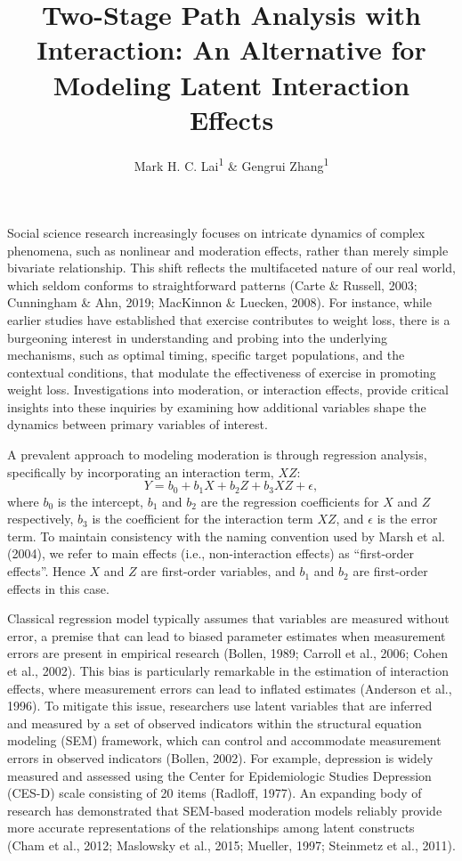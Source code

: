 \documentclass[
  man]{apa6}
\title{Two-Stage Path Analysis with Interaction: An Alternative for Modeling Latent Interaction Effects}
\author{Mark H. C. Lai\textsuperscript{1} \& Gengrui Zhang\textsuperscript{1}}
\date{}
\affiliation{\vspace{0.5cm}\textsuperscript{1} \protect{Department of Psychology, University of Southern California}}
\begin{document}
\maketitle

Social science research increasingly focuses on intricate dynamics of complex phenomena, such as nonlinear and moderation effects, rather than merely simple bivariate relationship. This shift reflects the multifaceted nature of our real world, which seldom conforms to straightforward patterns (Carte \& Russell, 2003; Cunningham \& Ahn, 2019; MacKinnon \& Luecken, 2008). For instance, while earlier studies have established that exercise contributes to weight loss, there is a burgeoning interest in understanding and probing into the underlying mechanisms, such as optimal timing, specific target populations, and the contextual conditions, that modulate the effectiveness of exercise in promoting weight loss. Investigations into moderation, or interaction effects, provide critical insights into these inquiries by examining how additional variables shape the dynamics between primary variables of interest.

A prevalent approach to modeling moderation is through regression analysis, specifically by incorporating an interaction term, \(XZ\):
\begin{equation}
Y = b_{0} + b_{1}X + b_{2}Z + b_{3}XZ + \epsilon,
\end{equation}
where \(b_{0}\) is the intercept, \(b_{1}\) and \(b_{2}\) are the regression coefficients for \(X\) and \(Z\) respectively, \(b_{3}\) is the coefficient for the interaction term \(XZ\), and \(\epsilon\) is the error term. To maintain consistency with the naming convention used by Marsh et al. (2004), we refer to main effects (i.e., non-interaction effects) as ``first-order effects''. Hence \(X\) and \(Z\) are first-order variables, and \(b_{1}\) and \(b_{2}\) are first-order effects in this case.

Classical regression model typically assumes that variables are measured without error, a premise that can lead to biased parameter estimates when measurement errors are present in empirical research (Bollen, 1989; Carroll et al., 2006; Cohen et al., 2002). This bias is particularly remarkable in the estimation of interaction effects, where measurement errors can lead to inflated estimates (Anderson et al., 1996). To mitigate this issue, researchers use latent variables that are inferred and measured by a set of observed indicators within the structural equation modeling (SEM) framework, which can control and accommodate measurement errors in observed indicators (Bollen, 2002). For example, depression is widely measured and assessed using the Center for Epidemiologic Studies Depression (CES-D) scale consisting of 20 items (Radloff, 1977). An expanding body of research has demonstrated that SEM-based moderation models reliably provide more accurate representations of the relationships among latent constructs (Cham et al., 2012; Maslowsky et al., 2015; Mueller, 1997; Steinmetz et al., 2011).
\end{document}
